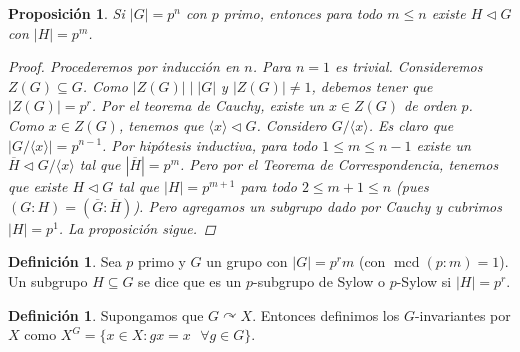 \documentclass[12pt]{book}
\newtheorem{prop}[teo]{Proposición}
\theoremstyle{definition}
\newtheorem{defn}[teo]{Definición}
\DeclareMathOperator{\mcd}{mcd}
\def\acts{\curvearrowright}
\begin{document}
\begin{prop}
Si $|G|=p^n$ con $p$ primo, entonces para todo $m\leq n$ existe $H\triangleleft G$ con $|H| = p^m$.
\begin{proof}
Procederemos por inducción en $n$. Para $n=1$ es trivial. Consideremos $Z(G)\subseteq G$. Como $|Z(G)|\mid |G|$ y $|Z(G)|\neq 1$, debemos tener que $|Z(G)| = p^r$. Por el teorema de Cauchy, existe un $x\in Z(G)$ de orden $p$. Como $x\in Z(G)$, tenemos que $\langle x\rangle \triangleleft G$. Considero $G/\langle x\rangle$. Es claro que $|G/\langle x\rangle| = p^{n-1}$. Por hipótesis inductiva, para todo $1\leq m\leq n-1$ existe un $\overline{H}\triangleleft G/\langle x\rangle$ tal que $|\overline{H}|=p^m$. Pero por el Teorema de Correspondencia, tenemos que existe $H\triangleleft G$ tal que $|H| = p^{m+1}$ para todo $2\leq m+1\leq n$ (pues $(G:H)=(\overline{G}:\overline{H})$). Pero agregamos un subgrupo dado por Cauchy y cubrimos $|H|=p^1$. La proposición sigue.
\end{proof}
\end{prop}

\begin{defn}
Sea $p$ primo y $G$ un grupo con $|G|=p^r m$ (con $\mcd (p:m)=1$). Un subgrupo $H\subseteq G$ se dice que es un $p$-subgrupo de Sylow o $p$-Sylow si $|H|=p^r$.	
\end{defn}

\begin{defn}
Supongamos que $G\acts X$. Entonces definimos los $G$-invariantes por $X$ como $X^G = \{x\in X : gx = x \text{ }\forall g\in G\}$.
\end{defn}
\end{document}

